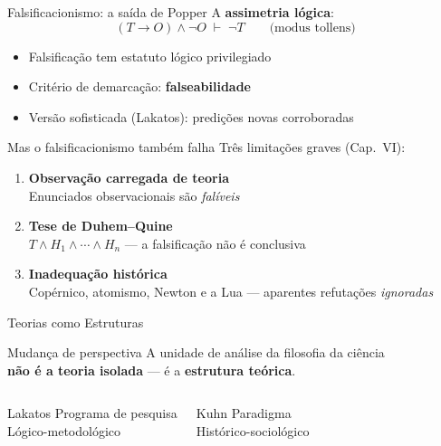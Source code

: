 \documentclass[aspectratio=169]{beamer}
\newcommand{\impt}[1]{\textcolor{maccent}{\textbf{#1}}}
\newcommand{\ntc}[1]{\textcolor{mprimary}{#1}}
\begin{document}
\begin{frame}{Falsificacionismo: a saída de Popper}
A \impt{assimetria lógica}:
\vspace{0.3cm}
\[
(T \rightarrow O) \wedge \neg O \;\vdash\; \neg T \qquad \text{(modus tollens)}
\]
\pause
\vspace{0.4cm}
\begin{itemize}
  \item Falsificação tem estatuto lógico privilegiado
  \item Critério de demarcação: \impt{falseabilidade}
  \item Versão sofisticada (Lakatos): predições novas corroboradas
\end{itemize}
\end{frame}

\begin{frame}{Mas o falsificacionismo também falha}
Três limitações graves (Cap.~VI):
\vspace{0.3cm}
\pause
\begin{enumerate}
  \item \impt{Observação carregada de teoria} \\
  Enunciados observacionais são \emph{falíveis}
  \pause
  \vspace{0.2cm}
  \item \impt{Tese de Duhem--Quine} \\
  $T \wedge H_1 \wedge \cdots \wedge H_n$ --- a falsificação não é conclusiva
  \pause
  \vspace{0.2cm}
  \item \impt{Inadequação histórica} \\
  Copérnico, atomismo, Newton e a Lua --- aparentes refutações \emph{ignoradas}
\end{enumerate}
\end{frame}

\begin{frame}{Teorias como Estruturas}
\begin{alertblock}{Mudança de perspectiva}
A unidade de análise da filosofia da ciência \\
\impt{não é a teoria isolada} --- é a \impt{estrutura teórica}.
\end{alertblock}
\vspace{0.4cm}
\pause
\begin{columns}[t]
\begin{block}{Lakatos}
Programa de pesquisa \\[0.1cm]
\ntc{Lógico-metodológico}
\end{block}

\pause
\begin{block}{Kuhn}
Paradigma \\[0.1cm]
\ntc{Histórico-sociológico}
\end{block}
\end{columns}
\end{frame}
\end{document}
